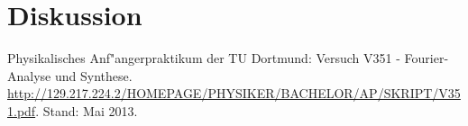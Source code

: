 \section{Diskussion}
\label{diskussion}

	

\begin{thebibliography}{9}
	 Physikalisches Anf"angerpraktikum der TU Dortmund: Versuch V351 - Fourier-Analyse und Synthese. \url{http://129.217.224.2/HOMEPAGE/PHYSIKER/BACHELOR/AP/SKRIPT/V351.pdf}. Stand: Mai 2013.
\end{thebibliography}
